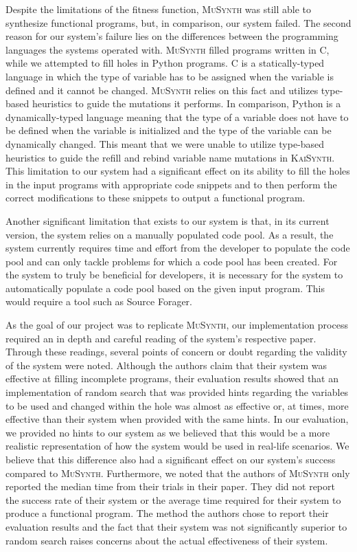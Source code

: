 \documentclass{article}
\begin{document}
Despite the limitations of the fitness function, \textsc{MuSynth} was still able to synthesize functional programs, but, in comparison, our system failed. The second reason for our system's failure lies on the differences between the programming languages the systems operated with. \textsc{MuSynth} filled programs written in C, while we attempted to fill holes in Python programs. C is a statically-typed language in which the type of variable has to be assigned when the variable is defined and it cannot be changed. \textsc{MuSynth} relies on this fact and utilizes type-based heuristics to guide the mutations it performs. In comparison, Python is a dynamically-typed language meaning that the type of a variable does not have to be defined when the variable is initialized and the type of the variable can be dynamically changed. This meant that we were unable to utilize type-based heuristics to guide the refill and rebind variable name mutations in \textsc{KaiSynth}. This limitation to our system had a significant effect on its ability to fill the holes in the input programs with appropriate code snippets and to then perform the correct modifications to these snippets to output a functional program.

Another significant limitation that exists to our system is that, in its current version, the system relies on a manually populated code pool. As a result, the system currently requires time and effort from the developer to populate the code pool and can only tackle problems for which a code pool has been created. For the system to truly be beneficial for developers, it is necessary for the system to automatically populate a code pool based on the given input program. This would require a tool such as Source Forager.

As the goal of our project was to replicate \textsc{MuSynth}, our implementation process required an in depth and careful reading of the system's respective paper. Through these readings, several points of concern or doubt regarding the validity of the system were noted. Although the authors claim that their system was effective at filling incomplete programs, their evaluation results showed that an implementation of random search that was provided hints regarding the variables to be used and changed within the hole was almost as effective or, at times, more effective than their system when provided with the same hints. In our evaluation, we provided no hints to our system as we believed that this would be a more realistic representation of how the system would be used in real-life scenarios. We believe that this difference also had a significant effect on our system's success compared to \textsc{MuSynth}. Furthermore, we noted that the authors of \textsc{MuSynth} only reported the median time from their trials in their paper. They did not report the success rate of their system or the average time required for their system to produce a functional program. The method the authors chose to report their evaluation results and the fact that their system was not significantly superior to random search raises concerns about the actual effectiveness of their system. 
\end{document}
